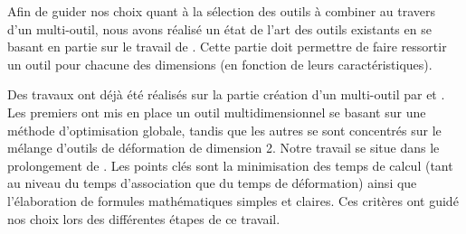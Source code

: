 Afin de guider nos choix quant à la sélection des outils à combiner au travers
d'un multi-outil, nous avons réalisé un état de l'art des outils existants en se
basant en partie sur le travail de \cite{GB08}. Cette partie doit permettre de
faire ressortir un outil pour chacune des dimensions (en fonction de leurs
caractéristiques).

Des travaux ont déjà été réalisés sur la partie création d'un multi-outil par
\cite{JBPS11} et \cite{GPCP13}. Les premiers ont mis en place un outil
multidimensionnel se basant sur une méthode d'optimisation globale, tandis que
les autres se sont concentrés sur le mélange d'outils de déformation de
dimension 2. Notre travail se situe dans le prolongement de \cite{GPCP13}. Les
points clés sont la minimisation des temps de calcul (tant au niveau du
temps d'association que du temps de déformation) ainsi que l'élaboration de
formules mathématiques simples et claires. Ces critères ont guidé nos choix lors
des différentes étapes de ce travail.
